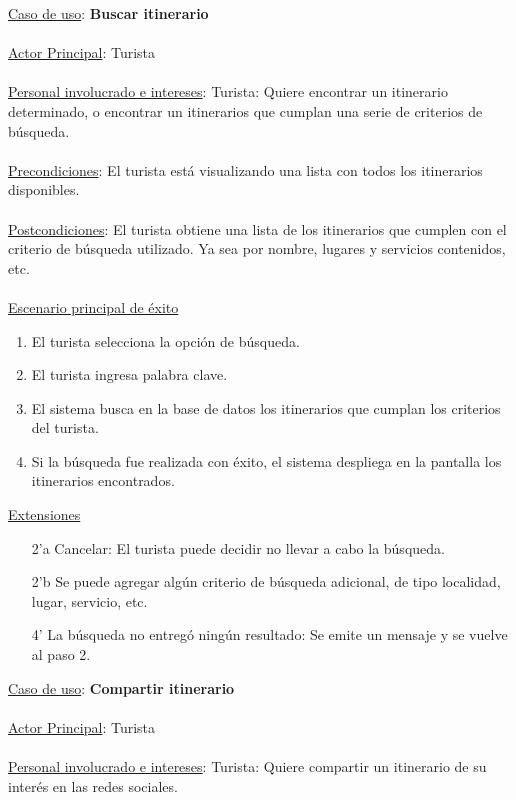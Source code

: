 \documentclass[12pt]{article}
\begin{document}
\underline{Caso de uso}: \textbf{Buscar itinerario}\\\\
\underline{Actor Principal}: Turista\\\\
\underline{Personal involucrado e intereses}: Turista: Quiere encontrar un itinerario determinado, o encontrar un itinerarios que cumplan una serie de criterios de búsqueda.\\\\
\underline{Precondiciones}:  El turista está visualizando una lista con todos los itinerarios disponibles.\\\\
\underline{Postcondiciones}: El turista obtiene una lista de los itinerarios que cumplen con el criterio de búsqueda utilizado. Ya sea por nombre, lugares y servicios contenidos, etc.\\\\
\underline{Escenario principal de éxito}
\begin{enumerate}
\item El turista selecciona la opción de búsqueda.
\item El turista ingresa palabra clave.
\item El sistema busca en la base de datos los itinerarios que cumplan los criterios del turista.
\item Si la búsqueda fue realizada con éxito, el sistema despliega en la pantalla los itinerarios encontrados.
\end{enumerate}
\underline{Extensiones}
\begin{enumerate}
\item[2'a] Cancelar: El turista puede decidir no llevar a cabo la búsqueda.
\item[2'b] Se puede agregar algún criterio de búsqueda adicional, de tipo localidad, lugar, servicio, etc.
\item[4'] La búsqueda no entregó ningún resultado: Se emite un mensaje y se vuelve al paso 2.
\end{enumerate}
\underline{Caso de uso}: \textbf{Compartir itinerario}\\\\
\underline{Actor Principal}: Turista\\\\
\underline{Personal involucrado e intereses}: Turista: Quiere compartir un itinerario de su interés en las redes sociales.\\\\
\end{document}
